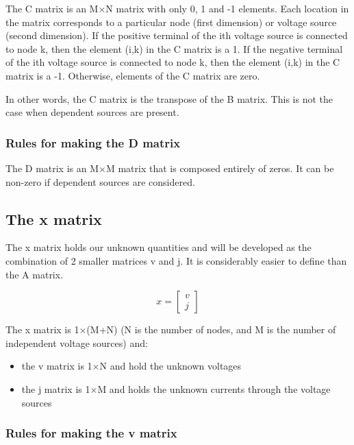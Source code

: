 The C matrix is an M$\times$N matrix with only 0, 1 and -1 elements.
Each location in the matrix corresponds to a particular node (first
dimension) or voltage source (second dimension).  If the positive
terminal of the ith voltage source is connected to node k, then the
element (i,k) in the C matrix is a 1.  If the negative terminal of the
ith voltage source is connected to node k, then the element (i,k) in
the C matrix is a -1.  Otherwise, elements of the C matrix are zero.

\addvspace{12pt}

In other words, the C matrix is the transpose of the B matrix.  This
is not the case when dependent sources are present.

\subsubsection{Rules for making the D matrix}

The D matrix is an M$\times$M matrix that is composed entirely of
zeros.  It can be non-zero if dependent sources are considered.

\subsection{The x matrix}
\label{sec:xmatrix}

The x matrix holds our unknown quantities and will be developed as the
combination of 2 smaller matrices v and j.  It is considerably easier
to define than the A matrix.

\begin{equation}
x =
\begin{bmatrix}
v\\
j
\end{bmatrix}
\end{equation}

The x matrix is 1$\times$(M+N) (N is the number of nodes, and M is the
number of independent voltage sources) and:

\begin{itemize}
\item
the v matrix is 1$\times$N and hold the unknown voltages
\item
the j matrix is 1$\times$M and holds the unknown currents through the
voltage sources
\end{itemize}

\subsubsection{Rules for making the v matrix}

